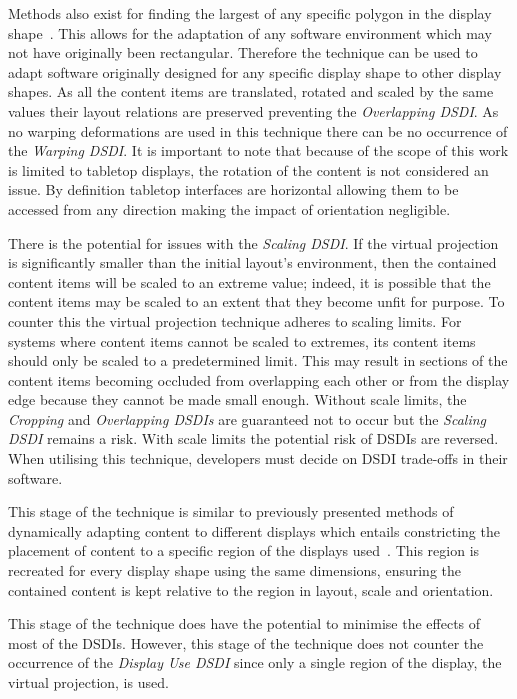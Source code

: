 \documentclass{bmcart}
\begin{document}
Methods also exist for finding the largest of any specific polygon in the display shape~\cite{Toussaint1983}.
This allows for the adaptation of any software environment which may not have originally been rectangular.
Therefore the technique can be used to adapt software originally designed for any specific display shape to other display shapes.
As all the content items are translated, rotated and scaled by the same values their layout relations are preserved preventing the {\emph{Overlapping \ac{DSDI}}}.
As no warping deformations are used in this technique there can be no occurrence of the {\emph{Warping \ac{DSDI}}}.
It is important to note that because of the scope of this work is limited to tabletop displays, the rotation of the content is not considered an issue.
By definition tabletop interfaces are horizontal allowing them to be accessed from any direction making the impact of orientation negligible.

There is the potential for issues with the {\emph{Scaling \ac{DSDI}}}.
If the virtual projection is significantly smaller than the initial
layout's environment, then the contained content items will be scaled to an extreme value; indeed, it is possible that the content items may be scaled to an extent that they become unfit for purpose.
To counter this the virtual projection technique adheres to scaling limits.
For systems where content items cannot be scaled to extremes, its content items should only be scaled to a predetermined limit.
This may result in sections of the content items becoming occluded from overlapping each other or from the display edge because they cannot be made small enough.
Without scale limits, the {\emph{Cropping}} and {\emph{Overlapping \acp{DSDI}}} are guaranteed not to occur but the {\emph{Scaling \ac{DSDI}}} remains a risk.
With scale limits the potential risk of \acp{DSDI} are reversed.
When utilising this technique, developers must decide on \ac{DSDI} trade-offs in their software.

This stage of the technique is similar to previously presented methods of dynamically adapting content to different displays which entails constricting the placement of content to a specific region of the displays used~\cite{Cotting2006,Raskar2003}.
This region is recreated for every display shape using the same dimensions, ensuring the contained content is kept relative to the region in layout, scale and orientation.

This stage of the technique does have the potential to minimise the effects of most of the \acp{DSDI}.
However, this stage of the technique does not counter the occurrence of the {\emph{Display Use \ac{DSDI}}} since only a single region of the display, the virtual projection, is used.
\end{document}
